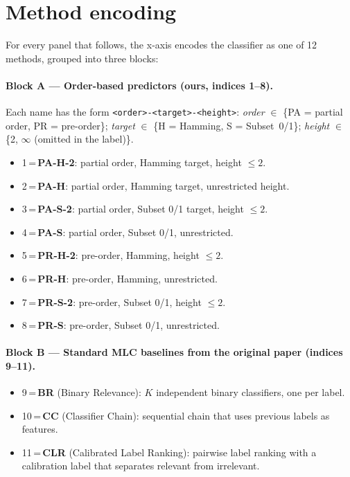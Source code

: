\documentclass[11pt]{article}
\begin{document}
\section{Method encoding}\label{sec:method_encoding}
For every panel that follows, the x-axis encodes the classifier as one of
12 methods, grouped into three blocks:

\paragraph{Block A --- Order-based predictors (ours, indices 1--8).}
Each name has the form \texttt{<order>-<target>-<height>}:
\emph{order} $\in$ \{PA = partial order, PR = pre-order\};
\emph{target} $\in$ \{H = Hamming, S = Subset~0/1\};
\emph{height} $\in$ \{2, $\infty$ (omitted in the label)\}.
\begin{itemize}
  \item 1\,=\,\textbf{PA-H-2}: partial order, Hamming target, height $\le 2$.
  \item 2\,=\,\textbf{PA-H}: partial order, Hamming target, unrestricted height.
  \item 3\,=\,\textbf{PA-S-2}: partial order, Subset 0/1 target, height $\le 2$.
  \item 4\,=\,\textbf{PA-S}: partial order, Subset 0/1, unrestricted.
  \item 5\,=\,\textbf{PR-H-2}: pre-order, Hamming, height $\le 2$.
  \item 6\,=\,\textbf{PR-H}: pre-order, Hamming, unrestricted.
  \item 7\,=\,\textbf{PR-S-2}: pre-order, Subset 0/1, height $\le 2$.
  \item 8\,=\,\textbf{PR-S}: pre-order, Subset 0/1, unrestricted.
\end{itemize}

\paragraph{Block B --- Standard MLC baselines from the original paper
(indices 9--11).}
\begin{itemize}
  \item 9\,=\,\textbf{BR} (Binary Relevance): $K$ independent binary
        classifiers, one per label.
  \item 10\,=\,\textbf{CC} (Classifier Chain): sequential chain that uses
        previous labels as features.
  \item 11\,=\,\textbf{CLR} (Calibrated Label Ranking): pairwise label
        ranking with a calibration label that separates relevant from
        irrelevant.
\end{itemize}
\end{document}
